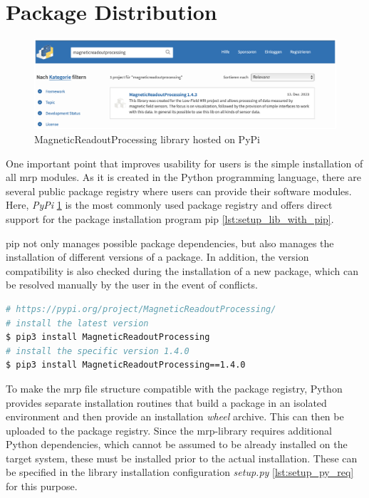 \hypertarget{package-distribution}{%
\section{Package Distribution}\label{package-distribution}}

\begin{figure}
\centering
\includegraphics{./generated_images/border_MagneticReadoutProcessing_library_hosted_on_PyPi.png}
\caption{MagneticReadoutProcessing library hosted on PyPi
\label{MagneticReadoutProcessing_library_hosted_on_PyPi.png}}
\end{figure}

One important point that improves usability for users is the simple
installation of all \gls{mrp} modules. As it is created in the Python
programming language, there are several public package registry where
users can provide their software modules. Here, \emph{PyPi}
\cite{PyPI}
\ref{MagneticReadoutProcessing_library_hosted_on_PyPi.png}
\cite{MagneticReadoutProcessingPyPI} is the most commonly used
package registry and offers direct support for the package installation
program \gls{pip} \ref{lst:setup_lib_with_pip}.

\gls{pip} not only manages possible package dependencies, but also
manages the installation of different versions of a package. In
addition, the version compatibility is also checked during the
installation of a new package, which can be resolved manually by the
user in the event of conflicts.

\begin{lstlisting}[language=bash, caption={Bash commands to install the MagneticReadoutProcessing library using pip}, label=lst:setup_lib_with_pip]
# https://pypi.org/project/MagneticReadoutProcessing/
# install the latest version
$ pip3 install MagneticReadoutProcessing
# install the specific version 1.4.0
$ pip3 install MagneticReadoutProcessing==1.4.0
\end{lstlisting}

To make the \gls{mrp} file structure compatible with the package
registry, Python provides separate installation routines that build a
package in an isolated environment and then provide an installation
\emph{wheel} archive. This can then be uploaded to the package registry.
Since the \gls{mrp}-library requires additional Python dependencies,
which cannot be assumed to be already installed on the target system,
these must be installed prior to the actual installation. These can be
specified in the library installation configuration \emph{setup.py}
\ref{lst:setup_py_req} for this purpose.


